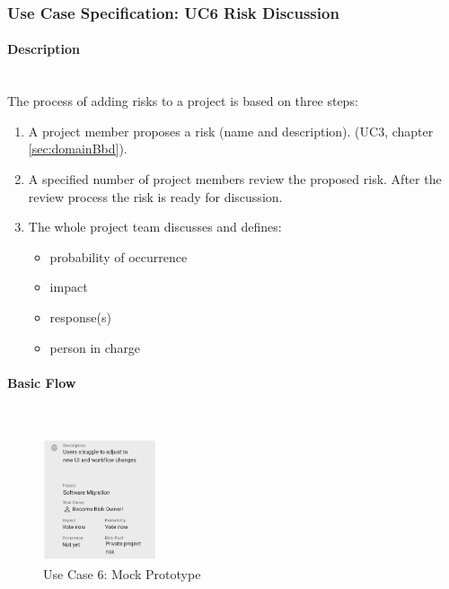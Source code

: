 
\newpage
\subsubsection{Use Case Specification: \ac{UC}6 Risk Discussion}
\label{sec:domainBbg}
\paragraph*{Description}\mbox{}\\
The process of adding risks to a project is based on three steps:
\begin{enumerate}
	\vspace{-3mm}
	\setlength\itemsep{-1em}
	
	\item A project member proposes a risk (name and description). (UC3, chapter \ref{sec:domainBbd}).
	\item A specified number of project members review the proposed risk. After the review process the risk is ready for discussion.
	\item The whole project team discusses and defines:
	\begin{itemize}
		\vspace{-3mm}
		\setlength\itemsep{-1em}	
		\item probability of occurrence
		\item impact
		\item response(s)
		\item person in charge
	\end{itemize}
\end{enumerate}

\paragraph*{Basic Flow} \mbox{}\\
\begin{figure}
	\includegraphics[width=0.3\textwidth]{Assets/UC_Screenshots/UC6S.png}
	\caption{Use Case 6: Mock Prototype}
	\label{fig:useCase6Detail}
\end{figure}

